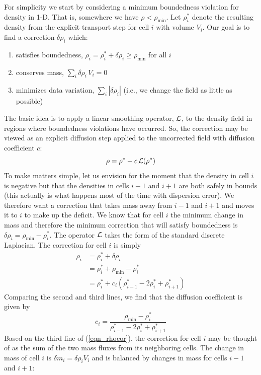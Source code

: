 For simplicity we start by considering a minimum boundedness violation for density in 1-D.  That is, somewhere we have $\rho < \rho_{\min}$.  Let $\rho_i^*$ denote the resulting density from the explicit transport step for cell $i$ with volume $V_i$.  Our goal is to find a correction $\delta \rho_i$ which:
\begin{enumerate}[{(}a{)}]
\item satisfies boundedness, $\rho_i = \rho_i^* + \delta \rho_i \ge \rho_{\min}$ for all $i$
\item conserves mass, $\sum_i \delta \rho_i \, V_i = 0$
\item minimizes data variation, $\sum_i |\delta \rho_i|$ (i.e., we change the field as little as possible)
\end{enumerate}
The basic idea is to apply a linear smoothing operator, $\cal L$, to the density field in regions where boundedness violations have occurred. So, the correction may be viewed as an explicit diffusion step applied to the uncorrected field with diffusion coefficient $c$:
\begin{equation}
\rho = \rho^* + c \, {\cal L} (\rho^*)
\end{equation}
To make matters simple, let us envision for the moment that the density in cell $i$ is negative but that the densities in cells $i-1$ and $i+1$ are both safely in bounds (this actually is what happens most of the time with dispersion error).  We therefore want a correction that takes mass away from $i-1$ and $i+1$ and moves it to $i$ to make up the deficit.  We know that for cell $i$ the minimum change in mass and therefore the minimum correction that will satisfy boundedness is $\delta \rho_i = \rho_{\min} - \rho_i^*$.  The operator $\cal L$ takes the form of the standard discrete Laplacian.  The correction for cell $i$ is simply
\begin{align}
\label{eqn_rhocor}
\rho_i &= \rho_i^* + \delta \rho_i \nonumber\\
&= \rho_i^* + \rho_{\min} - \rho_i^* \nonumber\\
&=  \rho_i^* + c_i (\rho_{i-1}^* - 2 \rho_i^* + \rho_{i+1}^*)
\end{align}
Comparing the second and third lines, we find that the diffusion coefficient is given by
\begin{equation}
\label{eqn_diffcoef}
c_i = \frac{\rho_{\min} - \rho_i^*}{\rho_{i-1}^* - 2 \rho_i^* + \rho_{i+1}^*}
\end{equation}
Based on the third line of (\ref{eqn_rhocor}), the correction for cell $i$ may be thought of as the sum of the two mass fluxes from its neighboring cells.  The change in mass of cell $i$ is $\delta m_i = \delta \rho_i V_i$ and is balanced by changes in mass for cells $i-1$ and $i+1$:
